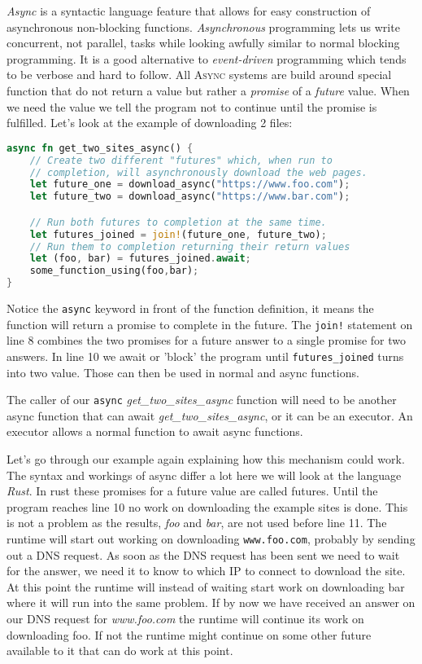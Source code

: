 \textit{Async} is a syntactic language feature that allows for easy construction of asynchronous non-blocking functions. \textit{Asynchronous} programming lets us write concurrent, not parallel, tasks while looking awfully similar to normal blocking programming. It is a good alternative to \textit{event-driven} programming which tends to be verbose and hard to follow. All \textsc{Async} systems are build around special function that do not return a value but rather a \textit{promise} of a \textit{future} value. When we need the value we tell the program not to continue until the promise is fulfilled. Let's look at the example of downloading 2 files:

\begin{lstlisting}[language=rust, style=boxed, tabsize=2]
async fn get_two_sites_async() {
	// Create two different "futures" which, when run to 
	// completion, will asynchronously download the web pages.
	let future_one = download_async("https://www.foo.com");
	let future_two = download_async("https://www.bar.com");

	// Run both futures to completion at the same time.
	let futures_joined = join!(future_one, future_two);
	// Run them to completion returning their return values
	let (foo, bar) = futures_joined.await;
	some_function_using(foo,bar);
}
\end{lstlisting}

Notice the \texttt{async} keyword in front of the function definition, it means the function will return a promise to complete in the future. The \texttt{join!} statement on line 8 combines the two promises for a future answer to a single promise for two answers. In line 10 we await or 'block' the program until \texttt{futures\_joined} turns into two value. Those can then be used in normal and async functions.

The caller of our \texttt{async} \textit{get\_two\_sites\_async} function will need to be another async function that can await \textit{get\_two\_sites\_async}, or it can be an executor. An executor allows a normal function to await async functions.

Let's go through our example again explaining how this mechanism could work. The syntax and workings of async differ a lot here we will look at the language \textit{Rust}. In rust these promises for a future value are called futures. Until the program reaches line 10 no work on downloading the example sites is done. This is not a problem as the results, \textit{foo} and \textit{bar}, are not used before line 11. The runtime will start out working on downloading \texttt{www.foo.com}, probably by sending out a DNS request. As soon as the DNS request has been sent we need to wait for the answer, we need it to know to which IP to connect to download the site. At this point the runtime will instead of waiting start work on downloading bar where it will run into the same problem. If by now we have received an answer on our DNS request for \textit{www.foo.com} the runtime will continue its work on downloading foo. If not the runtime might continue on some other future available to it that can do work at this point.

